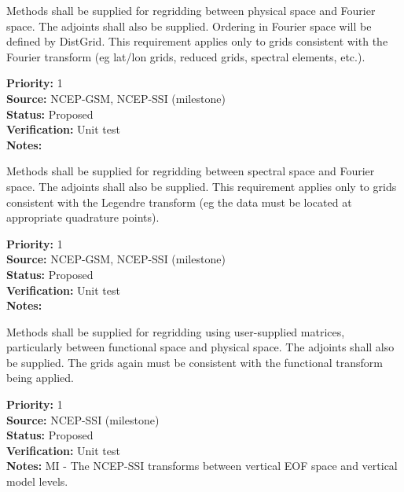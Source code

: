 
Methods shall be supplied for regridding between physical space and
Fourier space.  The adjoints shall also be supplied.  Ordering in
Fourier space will be defined by DistGrid.  This requirement applies only
to grids consistent with the Fourier transform (eg lat/lon grids,
reduced grids, spectral elements, etc.).

\begin{reqlist}
{\bf Priority:} 1 \\
{\bf Source:}  NCEP-GSM, NCEP-SSI (milestone) \\
{\bf Status:} Proposed \\
{\bf Verification:} Unit test \\
{\bf Notes:} 
\end{reqlist}


Methods shall be supplied for regridding between spectral space and
Fourier space.  The adjoints shall also be supplied.  This requirement
applies only to grids consistent with the Legendre transform (eg the
data must be located at appropriate quadrature points).

\begin{reqlist}
{\bf Priority:} 1 \\
{\bf Source:}  NCEP-GSM, NCEP-SSI (milestone) \\
{\bf Status:} Proposed \\
{\bf Verification:} Unit test \\
{\bf Notes:}
\end{reqlist}


Methods shall be supplied for regridding using user-supplied matrices,
particularly between functional space and physical space.
The adjoints shall also be supplied.  The grids again must be consistent
with the functional transform being applied.

\begin{reqlist}
{\bf Priority:} 1 \\
{\bf Source:}  NCEP-SSI (milestone) \\
{\bf Status:} Proposed \\
{\bf Verification:} Unit test \\
{\bf Notes:} MI - The NCEP-SSI transforms between vertical EOF space
             and vertical model levels.
\end{reqlist}

